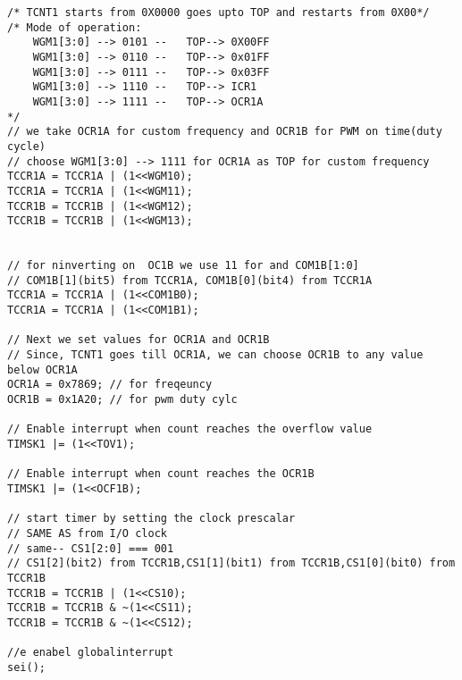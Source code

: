 \begin{verbatim}
/* TCNT1 starts from 0X0000 goes upto TOP and restarts from 0X00*/
/* Mode of operation:
    WGM1[3:0] --> 0101 --	TOP--> 0X00FF
    WGM1[3:0] --> 0110 --	TOP--> 0x01FF
    WGM1[3:0] --> 0111 --	TOP--> 0x03FF
    WGM1[3:0] --> 1110 --	TOP--> ICR1
    WGM1[3:0] --> 1111 --	TOP--> OCR1A
*/	
// we take OCR1A for custom frequency and OCR1B for PWM on time(duty cycle)	
// choose WGM1[3:0] --> 1111 for OCR1A as TOP for custom frequency
TCCR1A = TCCR1A | (1<<WGM10);
TCCR1A = TCCR1A | (1<<WGM11);
TCCR1B = TCCR1B | (1<<WGM12);
TCCR1B = TCCR1B | (1<<WGM13);


// for ninverting on  OC1B we use 11 for and COM1B[1:0]	
// COM1B[1](bit5) from TCCR1A, COM1B[0](bit4) from TCCR1A
TCCR1A = TCCR1A | (1<<COM1B0);
TCCR1A = TCCR1A | (1<<COM1B1);

// Next we set values for OCR1A and OCR1B
// Since, TCNT1 goes till OCR1A, we can choose OCR1B to any value below OCR1A
OCR1A = 0x7869; // for freqeuncy
OCR1B = 0x1A20; // for pwm duty cylc

// Enable interrupt when count reaches the overflow value
TIMSK1 |= (1<<TOV1);

// Enable interrupt when count reaches the OCR1B
TIMSK1 |= (1<<OCF1B);

// start timer by setting the clock prescalar
// SAME AS from I/O clock
// same-- CS1[2:0] === 001
// CS1[2](bit2) from TCCR1B,CS1[1](bit1) from TCCR1B,CS1[0](bit0) from TCCR1B
TCCR1B = TCCR1B | (1<<CS10);
TCCR1B = TCCR1B & ~(1<<CS11);
TCCR1B = TCCR1B & ~(1<<CS12);

//e enabel globalinterrupt
sei();
\end{verbatim}



